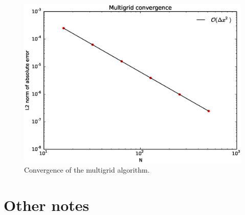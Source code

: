 \begin{figure}[t]
\centering
\includegraphics[width=\linewidth]{mg-converge}
\caption[Convergence of the multigrid
  algorithm]{\label{fig:mg:convergence} Convergence of the multigrid
  algorithm. \\ 
  }
\end{figure}


\section{Other notes}

